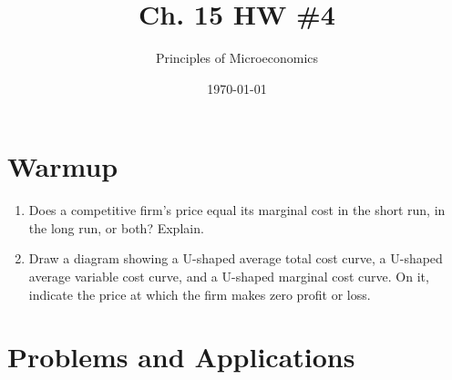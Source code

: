 \documentclass{article}
\title{Ch. 15 HW \#4}
\author{Principles of Microeconomics}
\date{\today}
\begin{document}
\maketitle

\section*{Warmup}

\begin{enumerate}

\item Does a competitive firm's price equal its marginal cost in the short run, in the long run, or both? Explain.

\item Draw a diagram showing a U-shaped average total cost curve, a U-shaped average variable cost curve, and a U-shaped marginal cost curve. On it, indicate the price at which the firm makes zero profit or loss.

\end{enumerate}

\section*{Problems and Applications}
\end{document}
